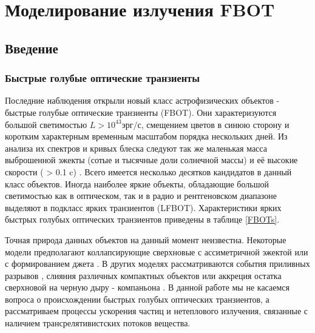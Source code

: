 \chapter{Моделирование излучения FBOT}\label{FBOT}
\section{Введение}
\subsection{Быстрые голубые оптические транзиенты}
Последние наблюдения открыли новый класс астрофизических объектов - быстрые голубые оптические транзиенты (FBOT)\cite{ Drout2014, Ho2019cow, Margutti2019}. Они характеризуются большой светимостью $L > 10^{43} эрг/с$, смещением цветов в синюю сторону и коротким характерным временным масштабом порядка нескольких дней. Из анализа их спектров и кривых блеска следуют так же маленькая масса выброшенной эжекты (сотые и тысячные доли солнечной массы) и её высокие скорости ( > 0.1 c) \cite{Margutti2019}. Всего имеется несколько десятков кандидатов в данный класс объектов. Иногда наиболее яркие объекты, обладающие большой светимостью как в оптическом, так и в радио и рентгеновском диапазоне выделяют в подкласс ярких транзиентов (LFBOT). Характеристики ярких быстрых голубых оптических транзиентов приведены в таблице \ref{FBOTs}.

Точная природа данных объектов на данный момент неизвестна. Некоторые модели предполагают коллапсирующие сверхновые с ассиметричной эжектой \cite{Margutti2019, Chrimes2025} или с формированием джета \cite{GottliebFBOTjet}. В других моделях рассматриваются события приливных разрывов \cite{Metzger2022, Kuin2019}, слияния различных компактных объектов \cite{Lyutikov2022} или аккреция остатка сверхновой на черную дыру - компаньона \cite{Lazzati2024}. В данной работе мы не касаемся вопроса о происхождении быстрых голубых оптических транзиентов, а рассматриваем процессы ускорения частиц и нетеплового излучения, связанные с наличием трансрелятивистских потоков вещества.

